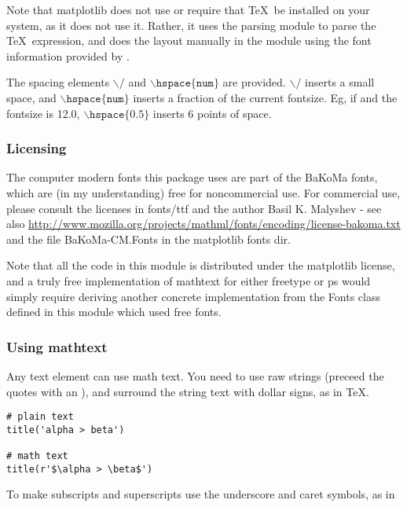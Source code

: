 \documentclass[]{book}
\begin{document}
Note that matplotlib does not use or require that \TeX\ be installed on
your system, as it does not use it.  Rather, it uses the parsing
module  to parse the \TeX\ expression, and does the
layout manually in the  module using the
font information provided by .  

\noindent The spacing elements $\backslash/$ and $\mathtt{\backslash
  hspace\{num\}}$ are provided.  $\backslash /$ inserts a small space,
and $\mathtt{\backslash hspace\{num\}}$ inserts a fraction of the
current fontsize.  Eg, if  and the fontsize is 12.0,
$\mathtt{\backslash hspace\{0.5\}}$ inserts 6 points of space.



\subsubsection{Licensing}
\label{sec:mathtext_license}

The computer modern fonts this package uses are part of the BaKoMa
fonts, which are (in my understanding) free for noncommercial use.
For commercial use, please consult the licenses in fonts/ttf and the
author Basil K. Malyshev - see also
\url{http://www.mozilla.org/projects/mathml/fonts/encoding/license-bakoma.txt}
and the file BaKoMa-CM.Fonts in the matplotlib fonts dir.

Note that all the code in this module is distributed under the
matplotlib license, and a truly free implementation of mathtext for
either freetype or ps would simply require deriving another concrete
implementation from the Fonts class defined in this module which used
free fonts.

\subsubsection{Using mathtext}


Any text element can use math text.  You need to use raw strings
(preceed the quotes with an ), and surround the string text
with dollar signs, as in \TeX.

\begin{lstlisting}
# plain text
title('alpha > beta')

# math text
title(r'$\alpha > \beta$')
\end{lstlisting}

\noindent To make subscripts and superscripts use the underscore and caret
symbols, as in
\end{document}
